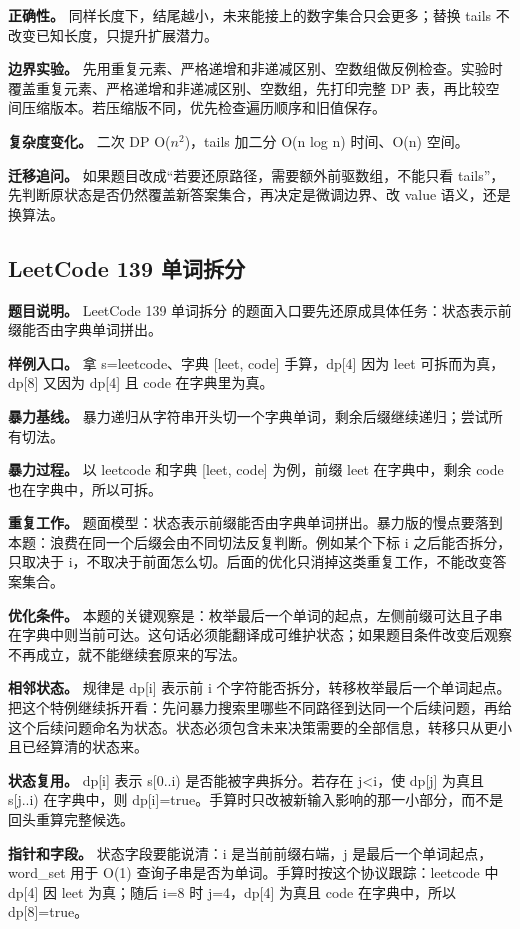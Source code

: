 \textbf{正确性。} 同样长度下，结尾越小，未来能接上的数字集合只会更多；替换 tails 不改变已知长度，只提升扩展潜力。

\textbf{边界实验。} 先用重复元素、严格递增和非递减区别、空数组做反例检查。实验时覆盖重复元素、严格递增和非递减区别、空数组，先打印完整 DP 表，再比较空间压缩版本。若压缩版不同，优先检查遍历顺序和旧值保存。

\textbf{复杂度变化。} 二次 DP O(\ensuremath{n^{2}})，tails 加二分 O(n log n) 时间、O(n) 空间。

\textbf{迁移追问。} 如果题目改成“若要还原路径，需要额外前驱数组，不能只看 tails”，先判断原状态是否仍然覆盖新答案集合，再决定是微调边界、改 value 语义，还是换算法。

\subsection{LeetCode 139 单词拆分}

\textbf{题目说明。} LeetCode 139 单词拆分 的题面入口要先还原成具体任务：状态表示前缀能否由字典单词拼出。

\textbf{样例入口。} 拿 s=leetcode、字典 [leet, code] 手算，dp[4] 因为 leet 可拆而为真，dp[8] 又因为 dp[4] 且 code 在字典里为真。

\textbf{暴力基线。} 暴力递归从字符串开头切一个字典单词，剩余后缀继续递归；尝试所有切法。

\textbf{暴力过程。} 以 leetcode 和字典 [leet, code] 为例，前缀 leet 在字典中，剩余 code 也在字典中，所以可拆。

\textbf{重复工作。} 题面模型：状态表示前缀能否由字典单词拼出。暴力版的慢点要落到本题：浪费在同一个后缀会由不同切法反复判断。例如某个下标 i 之后能否拆分，只取决于 i，不取决于前面怎么切。后面的优化只消掉这类重复工作，不能改变答案集合。

\textbf{优化条件。} 本题的关键观察是：枚举最后一个单词的起点，左侧前缀可达且子串在字典中则当前可达。这句话必须能翻译成可维护状态；如果题目条件改变后观察不再成立，就不能继续套原来的写法。

\textbf{相邻状态。} 规律是 dp[i] 表示前 i 个字符能否拆分，转移枚举最后一个单词起点。把这个特例继续拆开看：先问暴力搜索里哪些不同路径到达同一个后续问题，再给这个后续问题命名为状态。状态必须包含未来决策需要的全部信息，转移只从更小且已经算清的状态来。

\textbf{状态复用。} dp[i] 表示 s[0..i) 是否能被字典拆分。若存在 j<i，使 dp[j] 为真且 s[j..i) 在字典中，则 dp[i]=true。手算时只改被新输入影响的那一小部分，而不是回头重算完整候选。

\textbf{指针和字段。} 状态字段要能说清：i 是当前前缀右端，j 是最后一个单词起点，word\_set 用于 O(1) 查询子串是否为单词。手算时按这个协议跟踪：leetcode 中 dp[4] 因 leet 为真；随后 i=8 时 j=4，dp[4] 为真且 code 在字典中，所以 dp[8]=true。

